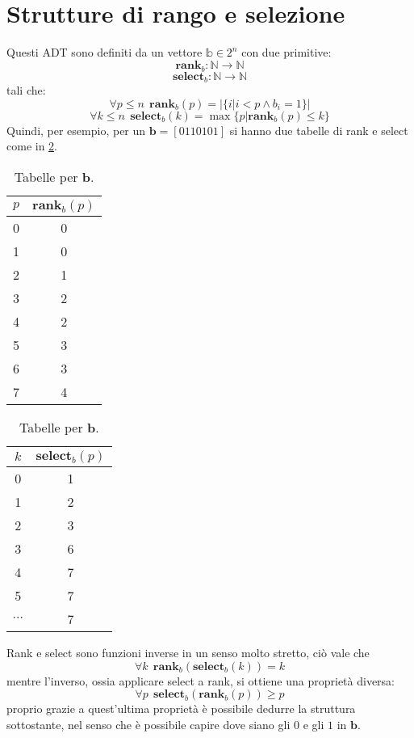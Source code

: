 \section{Strutture di rango e selezione}
Questi ADT sono definiti da un vettore $\mathbb{b} \in 2^n$ con due primitive:
$$
	\mathbf{rank}_b: \mathbb{N} \rightarrow \mathbb{N}
$$
$$
	\mathbf{select}_b: \mathbb{N} \rightarrow \mathbb{N}
$$
tali che:
$$
	\forall p \leq n ~~ \mathbf{rank}_b(p) = |\{i | i < p \land b_i = 1\}|
$$
$$
	\forall k \leq n ~~ \mathbf{select}_b(k) =\max \{p | \mathbf{rank}_b(p) \leq k\}
$$
Quindi, per esempio, per un $\mathbf{b} = [0 1 1 0 1 0 1]$ si hanno due
tabelle di rank e select come in \cref{table:rank_sel}.

\begin{table}[ht]
	\centering

	\begin{subtable}{0.45\textwidth}
		\centering
		\begin{tabular}{c|c}
			$p$ & $\mathbf{rank}_b(p)$ \\ \hline
			0   & 0                    \\
			1   & 0                    \\
			2   & 1                    \\
			3   & 2                    \\
			4   & 2                    \\
			5   & 3                    \\
			6   & 3                    \\
			7   & 4
		\end{tabular}
		\caption{$\mathbf{rank}_b(p)$}
	\end{subtable}
	\begin{subtable}{0.45\textwidth}
		\centering
		\begin{tabular}{c|c}
			$k$      & $\mathbf{select}_b(p)$ \\ \hline
			0        & 1                      \\
			1        & 2                      \\
			2        & 3                      \\
			3        & 6                      \\
			4        & 7                      \\
			5        & 7                      \\
			$\cdots$ & 7                      \\
		\end{tabular}
		\caption{$\mathbf{select}_b(p)$}
	\end{subtable}
	\caption{Tabelle per $\mathbf{b}$.}
	\label{table:rank_sel}
\end{table}
Rank e select sono funzioni inverse in un senso molto stretto, ciò vale che
$$
	\forall k ~~ \mathbf{rank}_b(\mathbf{select}_b(k)) = k
$$
mentre l'inverso, ossia applicare select a rank, si ottiene una proprietà
diversa:
$$
	\forall p ~~ \mathbf{select}_b(\mathbf{rank}_b(p)) \geq p
$$
proprio grazie a quest'ultima proprietà è possibile dedurre la struttura sottostante,
nel senso che è possibile capire dove siano gli $0$ e gli $1$ in $\mathbf{b}$.

